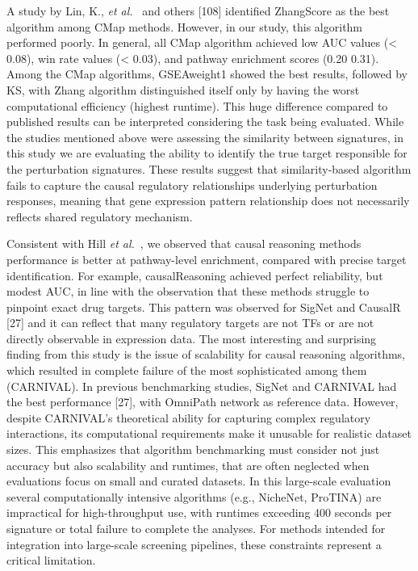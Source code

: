 A study by Lin, K., \textit{et al.}~\cite{RN79} and others [108] identified ZhangScore as the best algorithm among \gls{CMap} methods. 
However, in our study, this algorithm performed poorly. 
In general, all \gls{CMap} algorithm achieved low \gls{AUC} values (< 0.08), win rate values (< 0.03), and pathway enrichment scores (0.20  0.31). 
Among the \gls{CMap} algorithms, GSEAweight1 showed the best results, followed by \gls{KS}, with Zhang algorithm distinguished itself only by having the worst computational efficiency (highest runtime). 
This huge difference compared to published results can be interpreted considering the task being evaluated. 
While the studies mentioned above were assessing the similarity between signatures, in this study we are evaluating the ability to identify the true target responsible for the perturbation signatures. 
These results suggest that similarity-based algorithm fails to capture the causal regulatory relationships underlying perturbation responses, meaning that gene expression pattern relationship does not necessarily reflects shared regulatory mechanism.

Consistent with Hill \textit{et al.}~\cite{RN37}, we observed that causal reasoning methods performance is better at pathway-level enrichment, compared with precise target identification. 
For example, causalReasoning achieved perfect reliability, but modest \gls{AUC}, in line with the observation that these methods struggle to pinpoint exact drug targets. 
This pattern was observed for SigNet and CausalR [27] and it can reflect that many regulatory targets are not \gls{TF}s or are not directly observable in expression data. 
The most interesting and surprising finding from this study is the issue of scalability for causal reasoning algorithms, which resulted in complete failure of the most sophisticated among them (\gls{CARNIVAL}). 
In previous benchmarking studies, SigNet and CARNIVAL had the best performance [27], with OmniPath network as reference data. 
However, despite \gls{CARNIVAL}'s theoretical ability for capturing complex regulatory interactions, its computational requirements make it unusable for realistic dataset sizes. 
This emphasizes that algorithm benchmarking must consider not just accuracy but also scalability and runtimes, that are often neglected when evaluations focus on small and curated datasets. 
In this large-scale evaluation several computationally intensive algorithms (e.g., NicheNet, ProTINA) are impractical for high-throughput use, with runtimes exceeding 400 seconds per signature or total failure to complete the analyses. 
For methods intended for integration into large-scale screening pipelines, these constraints represent a critical limitation.

